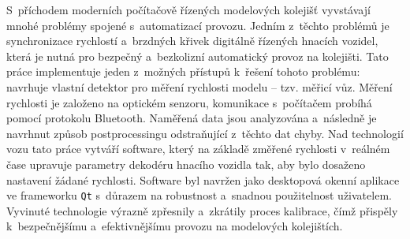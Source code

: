 S~příchodem moderních počítačově řízených modelových kolejišť vyvstávají mnohé
problémy spojené s~automatizací provozu. Jedním z~těchto problémů je
synchronizace rychlostí a~brzdných křivek digitálně řízených hnacích vozidel,
která je nutná pro bezpečný a~bezkolizní automatický provoz na kolejišti.
Tato práce implementuje jeden z~možných přístupů k~řešení tohoto problému:
navrhuje vlastní detektor pro měření rychlosti modelu -- tzv. měřicí vůz.
Měření rychlosti je založeno na optickém senzoru, komunikace s~počítačem
probíhá pomocí protokolu Bluetooth. Naměřená data jsou analyzována a~následně
je navrhnut způsob postprocessingu odstraňující z~těchto dat chyby.
Nad technologií vozu tato práce vytváří software, který na základě změřené
rychlosti v~reálném čase upravuje parametry dekodéru hnacího vozidla tak, aby
bylo dosaženo nastavení žádané rychlosti. Software byl navržen jako desktopová
okenní aplikace ve frameworku \texttt{Qt} s~důrazem na robustnost a~snadnou
použitelnost uživatelem. Vyvinuté technologie výrazně zpřesnily a~zkrátily
proces kalibrace, čímž přispěly k~bezpečnějšímu a~efektivnějšímu provozu
na modelových kolejištích.
